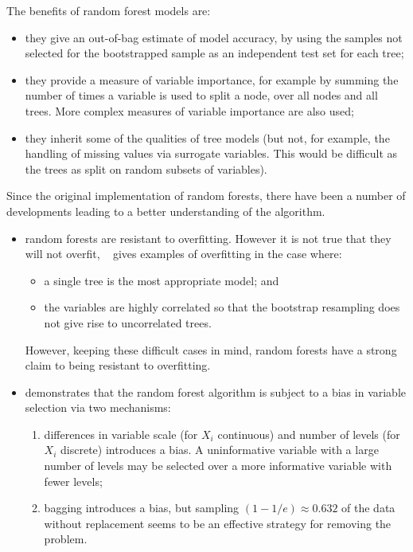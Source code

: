 \documentclass[10pt,letterpaper]{article}
\begin{document}
The benefits of random forest models are:
  \begin{itemize}
  \item they give an out-of-bag estimate of model accuracy, by using the samples not selected for the bootstrapped sample
    as an independent test set for each tree;
  \item they provide a measure of variable importance, for example by summing the number of times a variable is used to
    split a node, over all nodes and all trees. More complex measures of variable importance are also used;
  \item they inherit some of the qualities of tree models (but not, for example, the handling of missing values via surrogate
    variables. This would be difficult as the trees as split on random subsets of variables).
  \end{itemize}

Since the original implementation of random forests, there have been a number of developments leading to a better understanding of
the algorithm. 
\begin{itemize}
\item random forests are resistant to overfitting. However it is not true that they will not overfit,
  ~\cite{Segal.2004} gives examples of overfitting in the case where:
  \begin{itemize}
  \item a single tree is the most appropriate model; and
  \item the variables are highly correlated so that the bootstrap resampling does not give rise to uncorrelated trees.
  \end{itemize}
However, keeping these difficult cases in mind, random forests have a strong claim to being resistant to overfitting.

\item \cite{Strobl.et.al.2007} demonstrates that the random forest algorithm is subject to a bias in variable selection via two mechanisms:
  \begin{enumerate}
  \item differences in variable scale (for $X_i$ continuous) and number of levels (for $X_i$ discrete) introduces a
    bias. A uninformative variable with a large number of levels may be selected over a more informative variable with
    fewer levels;
  \item bagging introduces a bias, but sampling $(1- 1/e) \approx 0.632$ of the data without replacement seems to be an
    effective strategy for removing the problem.
  \end{enumerate}
\end{itemize} 
\end{document}
